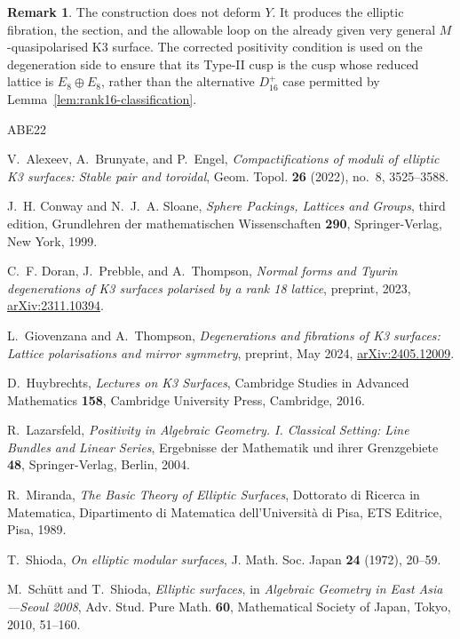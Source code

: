 \documentclass[11pt]{amsart}
\theoremstyle{definition}
\newtheorem{remark}[theorem]{Remark}
\begin{document}
\begin{remark}
The construction does not deform $Y$.  It produces the elliptic fibration,
the section, and the allowable loop on the already given very general
$M$-quasipolarised K3 surface.  The corrected positivity condition is used on
the degeneration side to ensure that its Type-II cusp is the cusp whose
reduced lattice is $E_8\oplus E_8$, rather than the alternative
$D_{16}^{+}$ case permitted by Lemma~\ref{lem:rank16-classification}.
\end{remark}

\begin{thebibliography}{ABE22}

V.~Alexeev, A.~Brunyate, and P.~Engel,
\emph{Compactifications of moduli of elliptic K3 surfaces: Stable pair and
toroidal},
Geom. Topol. \textbf{26} (2022), no.~8, 3525--3588.

J.~H. Conway and N.~J.~A. Sloane,
\emph{Sphere Packings, Lattices and Groups},
third edition, Grundlehren der mathematischen Wissenschaften \textbf{290},
Springer-Verlag, New York, 1999.

C.~F. Doran, J.~Prebble, and A.~Thompson,
\emph{Normal forms and Tyurin degenerations of K3 surfaces polarised by a
rank 18 lattice},
preprint, 2023,
\href{https://arxiv.org/abs/2311.10394}{arXiv:2311.10394}.

L.~Giovenzana and A.~Thompson,
\emph{Degenerations and fibrations of K3 surfaces: Lattice polarisations and
mirror symmetry},
preprint, May 2024,
\href{https://arxiv.org/abs/2405.12009}{arXiv:2405.12009}.

D.~Huybrechts,
\emph{Lectures on K3 Surfaces},
Cambridge Studies in Advanced Mathematics \textbf{158},
Cambridge University Press, Cambridge, 2016.

R.~Lazarsfeld,
\emph{Positivity in Algebraic Geometry. I. Classical Setting: Line Bundles
and Linear Series},
Ergebnisse der Mathematik und ihrer Grenzgebiete \textbf{48},
Springer-Verlag, Berlin, 2004.

R.~Miranda,
\emph{The Basic Theory of Elliptic Surfaces},
Dottorato di Ricerca in Matematica, Dipartimento di Matematica
dell'Universit\`a di Pisa, ETS Editrice, Pisa, 1989.

T.~Shioda,
\emph{On elliptic modular surfaces},
J. Math. Soc. Japan \textbf{24} (1972), 20--59.

M.~Sch\"utt and T.~Shioda,
\emph{Elliptic surfaces},
in \emph{Algebraic Geometry in East Asia---Seoul 2008},
Adv. Stud. Pure Math. \textbf{60}, Mathematical Society of Japan, Tokyo,
2010, 51--160.

\end{thebibliography}
\end{document}

